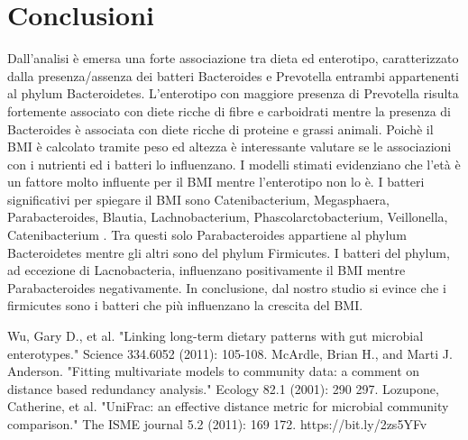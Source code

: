 \section{Conclusioni}
Dall'analisi è emersa una forte associazione tra dieta ed enterotipo, caratterizzato dalla presenza/assenza dei batteri Bacteroides e Prevotella entrambi appartenenti al phylum Bacteroidetes. L'enterotipo con maggiore presenza di Prevotella risulta fortemente associato con diete ricche di fibre e carboidrati mentre la presenza di Bacteroides è associata con diete ricche di proteine e grassi animali. Poichè il BMI è calcolato tramite peso ed altezza è interessante valutare se le associazioni con i nutrienti ed i batteri lo influenzano. I modelli stimati evidenziano che l'età è un fattore molto influente per il BMI mentre l'enterotipo non lo è. I batteri significativi per spiegare il BMI sono Catenibacterium, Megasphaera, Parabacteroides, Blautia, Lachnobacterium, Phascolarctobacterium, Veillonella, Catenibacterium . Tra questi solo Parabacteroides appartiene al phylum Bacteroidetes mentre gli altri sono del phylum Firmicutes. I batteri del phylum, ad eccezione di Lacnobacteria, influenzano positivamente il BMI mentre  Parabacteroides negativamente. In conclusione, dal nostro studio si evince che i firmicutes sono i batteri che più influenzano la crescita del BMI.


\begin{thebibliography}{9}
 Wu, Gary D., et al. "Linking long-term dietary patterns with gut microbial enterotypes." Science 334.6052 (2011): 105-108.
 McArdle, Brian H., and Marti J. Anderson. "Fitting multivariate models to community data: a comment on distance based redundancy analysis." Ecology 82.1 (2001): 290 297.
 Lozupone, Catherine, et al. "UniFrac: an effective distance metric for microbial community comparison." The ISME journal 5.2 (2011): 169 172.
 https://bit.ly/2zs5YFv
\end{thebibliography}
